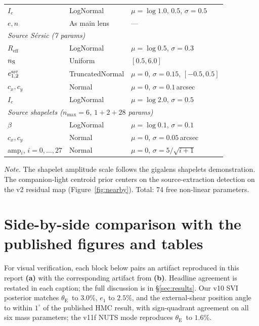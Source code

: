 \documentclass[11pt,letterpaper]{article}
\newcommand{\thetaE}{\ensuremath{\theta_{\mathrm{E}}}}
\newcommand{\eone}{\ensuremath{e_{1}}}
\begin{document}
\begin{table}[ht]
\begin{tabular}{lll}
$I_{e}$             & LogNormal & $\mu=\log 1.0,\,0.5$, $\sigma=0.5$ \\
$e,n$               & As main lens & --- \\
\midrule
\multicolumn{3}{l}{\textit{Source S\'{e}rsic (7 params)}} \\
$R_{\mathrm{eff}}$  & LogNormal       & $\mu=\log 0.5$, $\sigma=0.3$ \\
$n_{\rm S}$         & Uniform         & $[0.5, 6.0]$ \\
$e_{1,2}^{\rm src}$ & TruncatedNormal & $\mu=0$, $\sigma=0.15$, $[-0.5,0.5]$ \\
$c_{x},c_{y}$       & Normal          & $\mu=0$, $\sigma=0.1$\,arcsec \\
$I_{e}$             & LogNormal       & $\mu=\log 2.0$, $\sigma=0.5$ \\
\midrule
\multicolumn{3}{l}{\textit{Source shapelets ($n_{\max}=6$, $1+2+28$ params)}} \\
$\beta$                  & LogNormal & $\mu=\log 0.1$, $\sigma=0.1$ \\
$c_{x},c_{y}$            & Normal    & $\mu=0$, $\sigma=0.05$\,arcsec \\
amp$_{i}$, $i=0,\dots,27$ & Normal   & $\mu=0$, $\sigma=5/\sqrt{i+1}$ \\
\bottomrule
\end{tabular}
\par\smallskip
{\footnotesize\textit{Note.} The shapelet amplitude scale follows the
gigalens shapelets demonstration. The companion-light centroid prior
centers on the source-extraction detection on the v2 residual map
(Figure~\ref{fig:nearby}). Total: 74 free non-linear parameters.}
\end{table}

\section{Side-by-side comparison with the published figures and tables}
\label{app:compare}

For visual verification, each block below pairs an artifact reproduced in this
report \textbf{(a)} with the corresponding artifact from
\citet{huang2025foundry1} \textbf{(b)}. Headline agreement is restated in each
caption; the full discussion is in \S\ref{sec:results}. Our v10 SVI posterior
matches \thetaE\ to $3.0\%$, $\eone$ to $2.5\%$, and the external-shear position
angle to within $1^{\circ}$ of the published HMC result, with sign-quadrant
agreement on all six mass parameters; the v11f NUTS mode reproduces \thetaE\ to
$1.6\%$.
\end{document}
